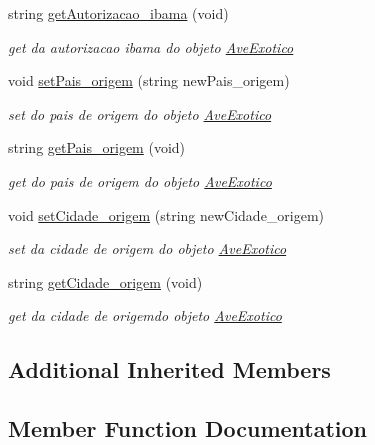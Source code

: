 \begin{DoxyCompactItemize}
string \mbox{\hyperlink{class_ave_exotico_abae14bfed76431955814d6fba9ec8a43}{get\+Autorizacao\+\_\+ibama}} (void)
\begin{DoxyCompactList}\small\item\em get da autorizacao ibama do objeto \mbox{\hyperlink{class_ave_exotico}{Ave\+Exotico}} \end{DoxyCompactList}\item 
void \mbox{\hyperlink{class_ave_exotico_aabb170c4566302961935769168a4a681}{set\+Pais\+\_\+origem}} (string new\+Pais\+\_\+origem)
\begin{DoxyCompactList}\small\item\em set do pais de origem do objeto \mbox{\hyperlink{class_ave_exotico}{Ave\+Exotico}} \end{DoxyCompactList}\item 
string \mbox{\hyperlink{class_ave_exotico_a1c7d53e251fa66937f2699d2bebb505e}{get\+Pais\+\_\+origem}} (void)
\begin{DoxyCompactList}\small\item\em get do pais de origem do objeto \mbox{\hyperlink{class_ave_exotico}{Ave\+Exotico}} \end{DoxyCompactList}\item 
void \mbox{\hyperlink{class_ave_exotico_a3aa6b89421640efc1e1276098f1752fc}{set\+Cidade\+\_\+origem}} (string new\+Cidade\+\_\+origem)
\begin{DoxyCompactList}\small\item\em set da cidade de origem do objeto \mbox{\hyperlink{class_ave_exotico}{Ave\+Exotico}} \end{DoxyCompactList}\item 
string \mbox{\hyperlink{class_ave_exotico_ae8ea1dd8dd3af80c99e6daf326f2da3a}{get\+Cidade\+\_\+origem}} (void)
\begin{DoxyCompactList}\small\item\em get da cidade de origemdo objeto \mbox{\hyperlink{class_ave_exotico}{Ave\+Exotico}} \end{DoxyCompactList}\end{DoxyCompactItemize}
\subsection*{Additional Inherited Members}


\subsection{Member Function Documentation}
\mbox{\label{class_ave_exotico_abae14bfed76431955814d6fba9ec8a43}} 
